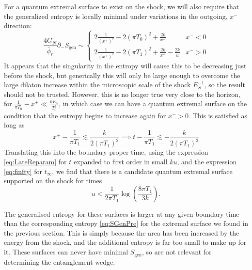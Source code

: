 \documentclass[12pt]{article}
\begin{document}
 For a quantum extremal surface to exist on the shock, we will also require that the generalized entropy is locally minimal under variations in the outgoing, $x^-$ direction:
 \begin{equation}
 	\frac{4G_N}{\bar{\phi}_r}\partial_- S_\text{gen} \sim  \begin{cases}2\frac{1}{(x^+)^2}-2(\pi T_0)^2+
 		\frac{2k}{x^-} & x^-<0 \\ 2\frac{1}{(x^+)^2}-2(\pi T_1)^2+ \frac{2k}{x^+}-\frac{2k}{u} & x^->0
 	\end{cases}
 \end{equation}
 It appears that the singularity in the entropy will cause this to be decreasing just before the shock, but generically this will only be large enough to overcome the large dilaton increase within the microscopic scale of the shock $E_S^{-1}$, so the result should not be trusted. However, this is no longer true very close to the horizon, for $\frac{1}{\pi T_0}-x^+  \ll \frac{kE_S}{T_0^3}$, in which case we can have a quantum extremal surface on the condition that the entropy begins to increase again for $x^->0$. This is satisfied as long as
 \begin{equation}
 	x^+-\frac{1}{\pi T_1} \lesssim \frac{k}{2(\pi T_1)^2} \implies t-\frac{1}{\pi T_1} \lesssim -\frac{k}{2(\pi T_1)^2}
 \end{equation}
Translating this into the boundary proper time, using the expression \eqref{eq:LateReparam} for $t$ expanded to first order in small $ku$, and the expression \eqref{eq:finfty} for $t_\infty$, we find that there is a candidate quantum extremal surface supported on the shock for times
\begin{equation}
	u< \frac{1}{2\pi T_1} \log\left(\frac{8\pi T_1}{3k}\right).
\end{equation}

The generalised entropy for these surfaces is larger at any given boundary time than the corresponding entropy \eqref{eq:SGenPre} for the extremal surface we found in the previous section. This is simply because the area has been increased by the energy from the shock, and the additional entropy is far too small to make up for it. These surfaces can never have minimal $S_\text{gen}$, so are not relevant for determining the entanglement wedge.
\end{document}
